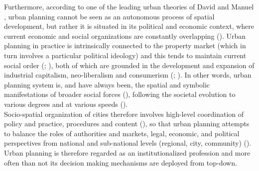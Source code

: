 \documentclass[11pt]{report}
\begin{document}
Furthermore, according to one of the leading urban theories of David \href{Harvey} \cite{Harvey???} and Manuel \href{Castells} \cite{Castells XXX}, urban planning cannot be seen as an autonomous process of spatial development, but rather it is situated in its political and economic context, where current economic and social organizations are constantly overlapping (\href{Taylor}{\citealt{taylor_urban_2006}}).
Urban planning in practice is intrinsically connected to the property market (which in turn involves a particular political ideology) and this tends to maintain current social order (\href{Dear}{\citealt{(dear_urbanization_1981}}; \href{Taylor}{\citealt{taylor_urban_2006}}), both of which are grounded in the development and expansion of industrial capitalism, neo-liberalism and consumerism (\href{Ellin}{\citealt{ellin_postmodern_1999}}; \href{Harvey}{\citealt{harvey_urban_1989}}).
In other words, urban planning system is, and have always been, the spatial and symbolic manifestations of broader social forces (\href{Giddens}{\citealt{giddens_consequences_1992}}), following the societal evolution to various degrees and at various speeds (\href{Flyvbjerg}{\cite{Flyvbjerg, 1998}}).
\\

Socio-spatial organization of cities therefore involves high-level coordination of policy and practice, procedures and content (\href{Van}{\cite{(Van Assche and Verschraegen, 2008}}), so that urban planning attempts to balance the roles of authorities and markets, legal, economic, and political perspectives from national and sub-national levels (regional, city, community) (\href{Nedovic}{\citealt{nedovic-budic_mornings_2011}}).
Urban planning is therefore regarded as an institutionalized profession and more often than not its decision making mechanisms are deployed from top-down.
\\
\end{document}

